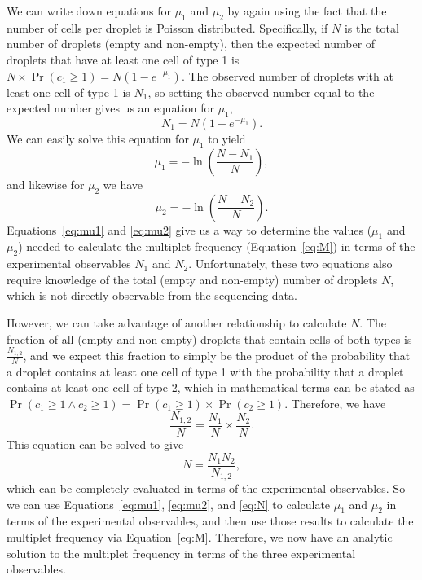 \documentclass[fleqn,10pt,lineno]{wlpeerj} %
\begin{document}
We can write down equations for $\mu_1$ and $\mu_2$ by again using the fact that the number of cells per droplet is Poisson distributed.
Specifically, if $N$ is the total number of droplets (empty and non-empty), then the expected number of droplets that have at least one cell of type 1 is $N \times \Pr\left(c_1 \ge 1\right) = N \left(1 - e^{-\mu_1}\right)$.
The observed number of droplets with at least one cell of type 1 is $N_1$, so setting the observed number equal to the expected number gives us an equation for $\mu_1$,
\begin{equation}
N_1 = N \left(1 - e^{-\mu_1}\right).
\end{equation}
We can easily solve this equation for $\mu_1$ to yield
\begin{equation}
\label{eq:mu1}
\mu_1 = -\ln\left(\frac{N - N_1}{N}\right),
\end{equation}
and likewise for $\mu_2$ we have
\begin{equation}
\label{eq:mu2}
\mu_2 = -\ln\left(\frac{N - N_2}{N}\right).
\end{equation}
Equations~\ref{eq:mu1} and \ref{eq:mu2} give us a way to determine the values ($\mu_1$ and $\mu_2$) needed to calculate the multiplet frequency (Equation~\ref{eq:M}) in terms of the experimental observables $N_1$ and $N_2$.
Unfortunately, these two equations also require knowledge of the total (empty and non-empty) number of droplets $N$, which is not directly observable from the sequencing data.

However, we can take advantage of another relationship to calculate $N$.
The fraction of all (empty and non-empty) droplets that contain cells of both types is $\frac{N_{1,2}}{N}$, and we expect this fraction to simply be the product of the probability that a droplet contains at least one cell of type 1 with the probability that a droplet contains at least one cell of type 2, which in mathematical terms can be stated as $\Pr\left(c_1 \ge 1 \land c_2 \ge 1\right) = \Pr\left(c_1 \ge 1\right) \times \Pr\left(c_2 \ge 1\right)$.
Therefore, we have
\begin{equation}
\frac{N_{1,2}}{N} = \frac{N_1}{N} \times \frac{N_2}{N}.
\end{equation}
This equation can be solved to give
\begin{equation}
\label{eq:N}
N = \frac{N_1 N_2}{N_{1,2}},
\end{equation}
which can be completely evaluated in terms of the experimental observables.
So we can use Equations~\ref{eq:mu1}, \ref{eq:mu2}, and \ref{eq:N} to calculate $\mu_1$ and $\mu_2$ in terms of the experimental observables, and then use those results to calculate the multiplet frequency via Equation~\ref{eq:M}.
Therefore, we now have an analytic solution to the multiplet frequency in terms of the three experimental observables.
\end{document}
